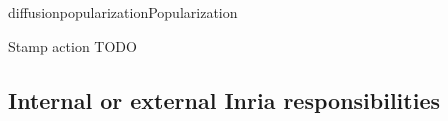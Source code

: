 \documentclass{ra2018}
\begin{document}
\begin{module}{diffusion}{popularization}{Popularization}

\begin{description}
	\item Stamp action TODO
	
\end{description}





\subsection{Internal or external Inria responsibilities}


\end{module}
\end{document}
